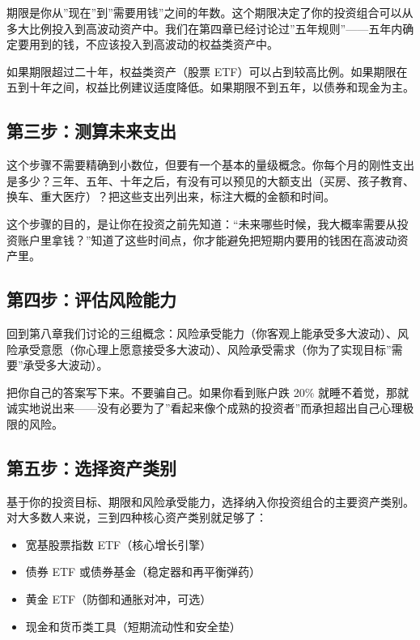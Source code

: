 \documentclass[a4paper,11pt,oneside,fontset=none,UTF8,zihao=-4]{ctexbook}
\providecommand{\tightlist}{\setlength{\itemsep}{2pt}\setlength{\parskip}{1pt}}
\begin{document}
期限是你从''现在''到''需要用钱''之间的年数。这个期限决定了你的投资组合可以从多大比例投入到高波动资产中。我们在第四章已经讨论过''五年规则''------五年内确定要用到的钱，不应该投入到高波动的权益类资产中。

如果期限超过二十年，权益类资产（股票
ETF）可以占到较高比例。如果期限在五到十年之间，权益比例建议适度降低。如果期限不到五年，以债券和现金为主。

\subsection{第三步：测算未来支出}\label{ux7b2cux4e09ux6b65ux6d4bux7b97ux672aux6765ux652fux51fa}

这个步骤不需要精确到小数位，但要有一个基本的量级概念。你每个月的刚性支出是多少？三年、五年、十年之后，有没有可以预见的大额支出（买房、孩子教育、换车、重大医疗）？把这些支出列出来，标注大概的金额和时间。

这个步骤的目的，是让你在投资之前先知道：``未来哪些时候，我大概率需要从投资账户里拿钱？''知道了这些时间点，你才能避免把短期内要用的钱困在高波动资产里。

\subsection{第四步：评估风险能力}\label{ux7b2cux56dbux6b65ux8bc4ux4f30ux98ceux9669ux80fdux529b}

回到第八章我们讨论的三组概念：风险承受能力（你客观上能承受多大波动）、风险承受意愿（你心理上愿意接受多大波动）、风险承受需求（你为了实现目标''需要''承受多大波动）。

把你自己的答案写下来。不要骗自己。如果你看到账户跌 20\%
就睡不着觉，那就诚实地说出来------没有必要为了''看起来像个成熟的投资者''而承担超出自己心理极限的风险。

\subsection{第五步：选择资产类别}\label{ux7b2cux4e94ux6b65ux9009ux62e9ux8d44ux4ea7ux7c7bux522b}

基于你的投资目标、期限和风险承受能力，选择纳入你投资组合的主要资产类别。对大多数人来说，三到四种核心资产类别就足够了：

\begin{itemize}
\tightlist
\item
  宽基股票指数 ETF（核心增长引擎）
\item
  债券 ETF 或债券基金（稳定器和再平衡弹药）
\item
  黄金 ETF（防御和通胀对冲，可选）
\item
  现金和货币类工具（短期流动性和安全垫）
\end{itemize}
\end{document}
